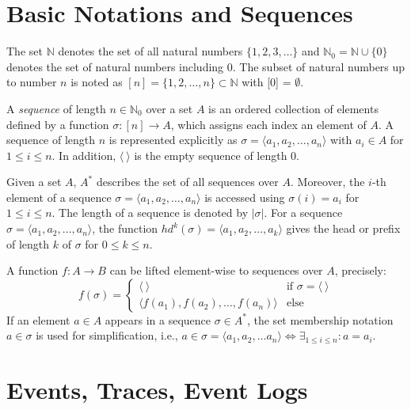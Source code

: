 \section{Basic Notations and Sequences}

The set $\mathbb{N}$ denotes the set of all natural numbers $\{1, 2, 3, \dots\}$ and $\mathbb{N}_0 = \mathbb{N} \cup \{0\}$ denotes the set of natural numbers including 0.
The subset of natural numbers up to number $n$ is noted as $[n] = \{1, 2, \dots, n\} \subset \mathbb{N}$ with [0] = $\emptyset$.
\begin{definition}[Sequence]
		A \textit{sequence} of length $n \in \mathbb{N}_0$ over a set $A$ is an ordered collection of elements defined by a function $\sigma \colon [n]\to A$, which assigns each index an element of $A$.
		A sequence  of length $n$ is represented explicitly as $\sigma = \langle a_1, a_2, \dots, a_n\rangle $ with $a_i \in A$ for $1 \leq i \leq n$. In addition, $\langle~\rangle$ is the empty sequence of length $0$.
\end{definition}
Given a set $A$, $A^*$ describes the set of all sequences over $A$.
Moreover, the $i$-th element of a sequence $\sigma = \langle a_1, a_2, \dots, a_n\rangle$ is accessed using $\sigma(i)= a_i$ for $1 \leq i \leq n$.
The length of a sequence is denoted by $|\sigma|$.
For a sequence $\sigma=\langle a_1, a_2, \dots, a_n\rangle$, the function
$hd^k(\sigma)= \langle a_1, a_2, \dots, a_k\rangle$ gives the head or prefix of length $k$ of $\sigma$ for $0 \leq k \leq n$.

A function $f \colon A \to B$ can be lifted element-wise to sequences over $A$, precisely:
\begin{equation*}
f(\sigma) =
\begin{cases}
\langle~\rangle & \text{if $\sigma = \langle~\rangle$} \\
\langle f(a_1), f(a_2), \dots, f(a_n)\rangle & \text{else} 
\end{cases}
\end{equation*}
If an element $a \in A$ appears in a sequence $\sigma \in A^*$, the set membership notation $a \in \sigma$ is used for simplification, i.e., $a \in \sigma = \langle a_1, a_2, \dots a_n \rangle \iff \exists_{1 \leq i \leq n} \colon a = a_i$.

\section{Events, Traces, Event Logs}


